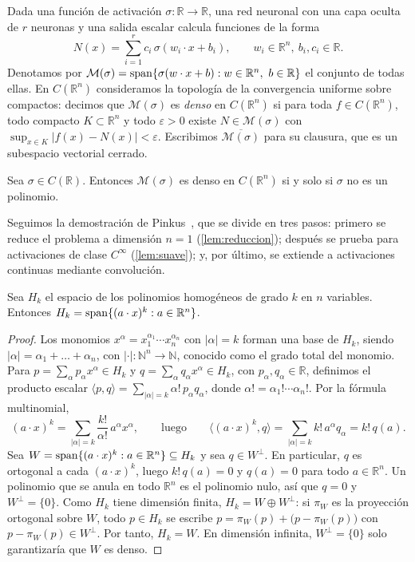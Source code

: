 Dada una función de activación $\sigma\colon\mathbb{R}\to\mathbb{R}$, una red neuronal con una capa oculta de $r$ neuronas y una salida escalar calcula funciones de la forma
\[
  N(x) = \sum_{i=1}^{r} c_i\,\sigma(w_i\cdot x + b_i), \qquad w_i\in\mathbb{R}^n,\ b_i, c_i\in\mathbb{R}.
\]
Denotamos por $\mathcal{M}(\sigma) = \operatorname{span}\{\sigma(w\cdot x + b) : w\in\mathbb{R}^n,\ b\in\mathbb{R}\}$ el conjunto de todas ellas. En $C(\mathbb{R}^n)$ consideramos la topología de la convergencia uniforme sobre compactos: decimos que $\mathcal{M}(\sigma)$ es \emph{denso} en $C(\mathbb{R}^n)$ si para toda $f\in C(\mathbb{R}^n)$, todo compacto $K\subset\mathbb{R}^n$ y todo $\varepsilon>0$ existe $N\in\mathcal{M}(\sigma)$ con $\sup_{x\in K}|f(x)-N(x)|<\varepsilon$. Escribimos $\overline{\mathcal{M}(\sigma)}$ para su clausura, que es un subespacio vectorial cerrado.
\begin{teorema}\label{teo:aprox-universal}
Sea $\sigma\in C(\mathbb{R})$. Entonces $\mathcal{M}(\sigma)$ es denso en $C(\mathbb{R}^n)$ si y solo si $\sigma$ no es un polinomio.
\end{teorema}

Seguimos la demostración de Pinkus~\cite[teorema~3.1]{pinkus1999approximation}, que se divide en tres pasos: primero se reduce el problema a dimensión $n=1$ (\cref{lem:reduccion}); después se prueba para activaciones de clase $C^\infty$ (\cref{lem:suave}); y, por último, se extiende a activaciones continuas mediante convolución.

\begin{lema}\label{lem:homogeneos}
Sea $H_k$ el espacio de los polinomios homogéneos de grado $k$ en $n$ variables. Entonces $H_k = \operatorname{span}\{(a\cdot x)^k : a\in\mathbb{R}^n\}$.
\end{lema}

\begin{proof}
Los monomios $x^\alpha = x_1^{\alpha_1}\cdots x_n^{\alpha_n}$ con $|\alpha|=k$ forman una base de $H_k$, siendo $|\alpha|=\alpha_1+\dots+\alpha_n$, con $|\cdot|:\mathbb{N}^n\to\mathbb{N}$, conocido como el grado total del monomio. Para $p=\sum_\alpha p_\alpha x^\alpha \in H_k$ y $q=\sum_\alpha q_\alpha x^\alpha \in H_k$, con $p_\alpha, q_\alpha \in \mathbb{R}$, definimos
el producto escalar $\langle p,q\rangle = \sum_{|\alpha|=k}\alpha!\,p_\alpha q_\alpha$, donde $\alpha! = \alpha_1!\cdots\alpha_n!$. Por la fórmula multinomial,
\[
  (a\cdot x)^k = \sum_{|\alpha|=k}\frac{k!}{\alpha!}\,a^\alpha x^\alpha,
  \qquad\text{luego}\qquad
  \bigl\langle (a\cdot x)^k, q\bigr\rangle = \sum_{|\alpha|=k} k!\,a^\alpha q_\alpha = k!\,q(a).
\]
Sea $W=\operatorname{span}\{(a\cdot x)^k : a\in\mathbb{R}^n\}\subseteq H_k$ y sea $q\in W^\perp$. En particular, $q$ es ortogonal a cada $(a\cdot x)^k$, luego $k!\,q(a)=0$ y $q(a)=0$ para todo $a\in\mathbb{R}^n$. Un polinomio que se anula en todo $\mathbb{R}^n$ es el polinomio nulo, así que $q=0$ y $W^\perp=\{0\}$. Como $H_k$ tiene dimensión finita, $H_k=W\oplus W^\perp$: si $\pi_W$ es la proyección ortogonal sobre $W$, todo $p\in H_k$ se escribe $p=\pi_W(p)+\bigl(p-\pi_W(p)\bigr)$ con $p-\pi_W(p)\in W^\perp$. Por tanto, $H_k=W$. En dimensión infinita, $W^\perp=\{0\}$ solo garantizaría que $W$ es denso.
\end{proof}

